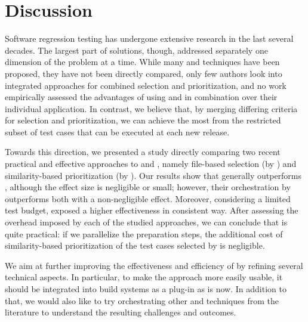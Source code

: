 \section{Discussion}\label{sec:orch_discussion}

Software regression testing has undergone extensive research in the last several decades.
The largest part of solutions, though, addressed separately one dimension of the problem at a time.
While many \tcs and \tcp techniques have been proposed, they have not been directly compared, only
few authors look into integrated approaches for combined selection and prioritization, and no work empirically assessed the advantages of using \tcs and \tcp in combination over their individual application.
In contrast, we believe that, by merging differing criteria for selection and prioritization, we can achieve the most from the restricted subset of test cases that can be executed at each new release.

Towards this direction, we presented a study directly comparing 
two recent practical and effective approaches to \tcs and \tcp, namely 
file-based selection (by \ek) and similarity-based prioritization (by \fs).
Our results show that \ek generally outperforms \fs, although the effect size is negligible or small;
however, their orchestration by \fz outperforms both with a non-negligible effect. 
Moreover, considering a limited test budget, \fz exposed a higher effectiveness in consistent way. 
After assessing the overhead imposed by each of the studied approaches, we can conclude that \fz is quite practical: if we parallelize the preparation steps, the additional cost of similarity-based prioritization of the test cases selected by \ek is negligible.  

We aim at further improving the effectiveness and efficiency of \fz by refining several technical aspects. 
In particular, to make the approach more easily usable, it should be integrated into build systems as a plug-in as \ek is now.
In addition to that, we would also like to try orchestrating other \tcs and \tcp techniques from the literature to understand the resulting challenges and outcomes.



